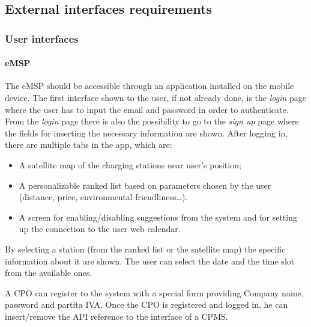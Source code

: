 \subsection{External interfaces requirements}

\subsubsection{User interfaces}
\paragraph{\ac{eMSP}}
The \ac{eMSP} should be accessible through an application installed on the mobile device.
The first interface shown to the user, if not already done, is the \textit{login} page where the user has to input the email and password in order to authenticate.
From the \textit{login} page there is also the possibility to go to the \textit{sign up} page where the fields for inserting the necessary information are shown.
After logging in, there are multiple tabs in the app, which are:
\begin{itemize}
    \item A satellite map of the charging stations near user's position;
    \item A personalizable ranked list based on parameters chosen by the user (distance, price, environmental friendliness\ldots).
    \item A screen for enabling/disabling suggestions from the system and for setting up the connection to the user web calendar.
\end{itemize}
By selecting a station (from the ranked list or the satellite map) the specific information about it are shown. The user can select the date and the time slot from the available ones.

A \ac{CPO} can register to the system with a special form providing Company name, password and \gls{partita IVA}. Once the \ac{CPO} is registered and logged in, he can insert/remove the \ac{API} reference to the interface of a \ac{CPMS}.

